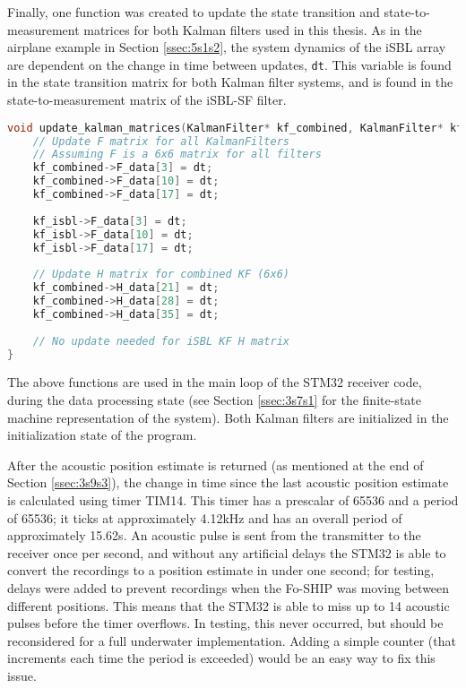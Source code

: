 \documentclass[11pt]{ucthesisCP}
\begin{document}
Finally, one function was created to update the state transition and state-to-measurement matrices for both Kalman filters used in this thesis. As in the airplane example in Section \ref{ssec:5s1s2}, the system dynamics of the iSBL array are dependent on the change in time between updates, \verb|dt|. This variable is found in the state transition matrix for both Kalman filter systems, and is found in the state-to-measurement matrix of the iSBL-SF filter.

\begin{lstlisting}[language=C++]
void update_kalman_matrices(KalmanFilter* kf_combined, KalmanFilter* kf_isbl, float32_t dt) {
	// Update F matrix for all KalmanFilters
	// Assuming F is a 6x6 matrix for all filters
	kf_combined->F_data[3] = dt;
	kf_combined->F_data[10] = dt;
	kf_combined->F_data[17] = dt;
	
	kf_isbl->F_data[3] = dt;
	kf_isbl->F_data[10] = dt;
	kf_isbl->F_data[17] = dt;
	
	// Update H matrix for combined KF (6x6)
	kf_combined->H_data[21] = dt;
	kf_combined->H_data[28] = dt;
	kf_combined->H_data[35] = dt;
	
	// No update needed for iSBL KF H matrix
}
\end{lstlisting}

The above functions are used in the main loop of the STM32 receiver code, during the data processing state (see Section \ref{ssec:3s7s1} for the finite-state machine representation of the system). Both Kalman filters are initialized in the initialization state of the program.

After the acoustic position estimate is returned (as mentioned at the end of Section \ref{ssec:3s9s3}), the change in time since the last acoustic position estimate is calculated using timer TIM14. This timer has a prescalar of 65536 and a period of 65536; it ticks at approximately 4.12kHz and has an overall period of approximately 15.62s. An acoustic pulse is sent from the transmitter to the receiver once per second, and without any artificial delays the STM32 is able to convert the recordings to a position estimate in under one second; for testing, delays were added to prevent recordings when the Fo-SHIP was moving between different positions. This means that the STM32 is able to miss up to 14 acoustic pulses before the timer overflows. In testing, this never occurred, but should be reconsidered for a full underwater implementation. Adding a simple counter (that increments each time the period is exceeded) would be an easy way to fix this issue.
\end{document}
